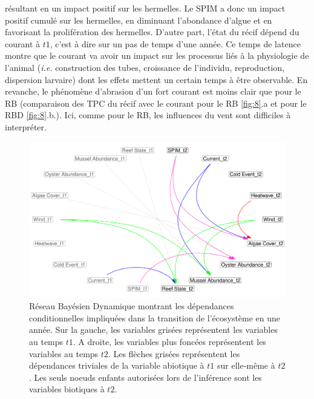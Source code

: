\documentclass[12pt]{report}
\begin{document}
\begin{figure}
\end{figure} résultant en un impact positif sur les hermelles. Le SPIM a donc un impact positif cumulé sur les hermelles, en diminuant l'abondance d'algue et en favorisant la prolifération des hermelles. D'autre part, l'état du récif dépend du courant à $t1$, c'est à dire sur un pas de temps d'une année. Ce temps de latence montre que le courant va avoir un impact sur les processus liés à la physiologie de l'animal (\textit{i.e.} construction des tubes, croissance de l'individu, reproduction, dispersion larvaire) dont les effets mettent un certain temps à être observable. En revanche, le phénomène d'abrasion d'un fort courant est moins clair que pour le RB (comparaison des TPC du récif avec le courant pour le RB \autoref{fig:8}.a et pour le RBD \autoref{fig:8}.b.). Ici, comme pour le RB, les influences du vent sont difficiles à interpréter. 

\begin{figure}[t]
    \centering
    \includegraphics[width = \linewidth]{dbnreport_correct.pdf}
    \caption[Réseau Bayésien Dynamique]{Réseau Bayésien Dynamique montrant les dépendances conditionnelles impliquées dans la transition de l'écosystème en une année. Sur la gauche, les variables grisées représentent les variables au temps $t1$. A droite, les variables plus foncées représentent les variables au temps $t2$. Les flèches grisées représentent les dépendances triviales de la variable abiotique à $t1$ sur elle-même à $t2$. Les seuls noeuds enfants autorisées lors de l'inférence sont les variables biotiques à $t2$.}
    \label{fig:9}
\end{figure}

\let\cleardoublepage\relax
\vspace{50pt}
\end{document}
